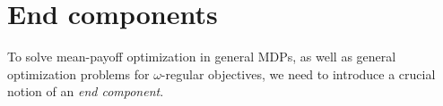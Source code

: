 %
%
%

















\section{End components}

To solve mean-payoff optimization in general MDPs, as well as general optimization problems for $\omega$-regular objectives, we need to introduce a crucial notion of an \emph{end component}.

